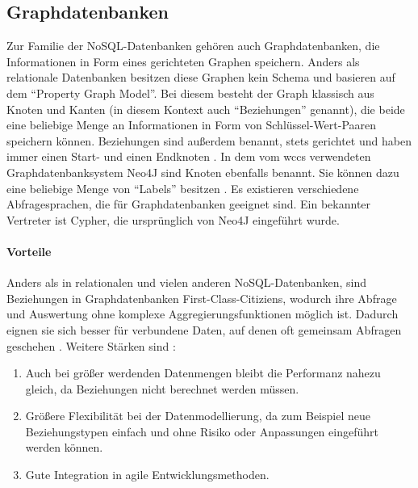 \subsection{Graphdatenbanken}
    Zur Familie der NoSQL-Datenbanken gehören auch Graphdatenbanken,
    die Informationen in Form eines gerichteten Graphen speichern.
    Anders als relationale Datenbanken besitzen diese Graphen kein Schema
    und basieren auf dem "`Property Graph Model"'.
    Bei diesem besteht der Graph klassisch aus Knoten und Kanten
    (in diesem Kontext auch "`Beziehungen"' genannt),
    die beide eine beliebige Menge an Informationen in Form
    von Schlüssel-Wert-Paaren speichern können.
    Beziehungen sind außerdem benannt, stets gerichtet und haben immer einen
    Start- und einen Endknoten
    \cite[Kapitel 1]{robinson:graphdatabases}.
    In dem vom \gls{wccs} verwendeten Graphdatenbanksystem Neo4J sind Knoten ebenfalls benannt.
    Sie können dazu eine beliebige Menge von "`Labels"' besitzen
    \cite[Kapitel 1.2.1.4]{neo4j:documentation}.
    Es existieren verschiedene Abfragesprachen, die für Graphdatenbanken geeignet sind.
    Ein bekannter Vertreter ist Cypher, die ursprünglich von Neo4J \cite[Kapitel 3]{neo4j:documentation} eingeführt wurde.

    \paragraph*{Vorteile}
    Anders als in relationalen und vielen anderen NoSQL-Datenbanken,
    sind Beziehungen in Graphdatenbanken First-Class-Citiziens,
    wodurch ihre Abfrage und Auswertung ohne komplexe Aggregierungsfunktionen möglich ist.
    Dadurch eignen sie sich besser für verbundene Daten,
    auf denen oft gemeinsam Abfragen geschehen
    \cite[Kapitel 2]{robinson:graphdatabases}
    \cite[Kapitel 11.2]{sadalage:nosql}.
    Weitere Stärken sind
    \cite[Kapitel 1]{robinson:graphdatabases}
    \cite[Kapitel 11.1]{sadalage:nosql}:
    
    \begin{enumerate}
        \item   Auch bei größer werdenden Datenmengen bleibt die Performanz nahezu gleich,
                da Beziehungen nicht berechnet werden müssen.
        \item   Größere Flexibilität bei der Datenmodellierung, da zum Beispiel
                neue Beziehungstypen einfach und ohne Risiko oder Anpassungen eingeführt werden können.
        \item   Gute Integration in agile Entwicklungsmethoden.
    \end{enumerate}
    

